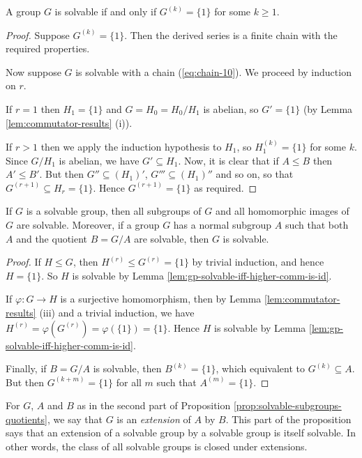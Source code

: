\begin{lemma}\label{lem:gp-solvable-iff-higher-comm-is-id} %
	A group $G$ is solvable if and only if $G^{(k)} = \{1\}$ for some $k \geq 1$.
	\begin{proof}
		Suppose $G^{(k)} = \{1\}$. Then the derived series is a finite chain with the required properties.
		
		Now suppose $G$ is solvable with a chain (\ref{eq:chain-10}). We proceed by induction on $r$.
		
		If $r = 1$ then $H_1 = \{1\}$ and $G = H_0 = H_0 / H_1$ is abelian, so $G' = \{1\}$ (by Lemma \ref{lem:commutator-results} (i)).
		
		If $r > 1$ then we apply the induction hypothesis to $H_1$, so $H_1^{(k)} = \{1\}$ for some $k$. Since $G / H_1$ is abelian, we have $G' \subseteq H_1$. Now, it is clear that if $A \leq B$ then $A' \leq B'$. But then $G'' \subseteq (H_1)'$, $G''' \subseteq (H_1)''$ and so on, so that $G^{(r + 1)} \subseteq H_r = \{1\}$. Hence $G^{(r + 1)} = \{1\}$ as required.
	\end{proof}
\end{lemma}

\begin{proposition}\label{prop:solvable-subgroups-quotients}
	If $G$ is a solvable group, then all subgroups of $G$ and all homomorphic images of $G$ are solvable. Moreover, if a group $G$ has a normal subgroup $A$ such that both $A$ and the quotient $B = G / A$ are solvable, then $G$ is solvable.
	\begin{proof}
		If $H \leq G$, then $H^{(r)} \leq G^{(r)} = \{1\}$ by trivial induction, and hence $H = \{1\}$. So $H$ is solvable by Lemma \ref{lem:gp-solvable-iff-higher-comm-is-id}.
		
		If $\varphi : G \to H$ is a surjective homomorphism, then by Lemma \ref{lem:commutator-results} (iii) and a trivial induction, we have $H^{(r)} = \varphi(G^{(r)}) = \varphi(\{1\}) = \{1\}$. Hence $H$ is solvable by Lemma \ref{lem:gp-solvable-iff-higher-comm-is-id}.
		
		Finally, if $B = G / A$ is solvable, then $B^{(k)} = \{1\}$, which equivalent to $G^{(k)} \subseteq A$. But then $G^{(k + m)} = \{1\}$ for all $m$ such that $A^{(m)} = \{1\}$.
	\end{proof}
\end{proposition}

\begin{remark}
	For $G$, $A$ and $B$ as in the second part of Proposition \ref{prop:solvable-subgroups-quotients}, we say that $G$ is an \emph{extension} of $A$ by $B$. This part of the proposition says that an extension of a solvable group by a solvable group is itself solvable. In other words, the class of all solvable groups is closed under extensions.
\end{remark}

